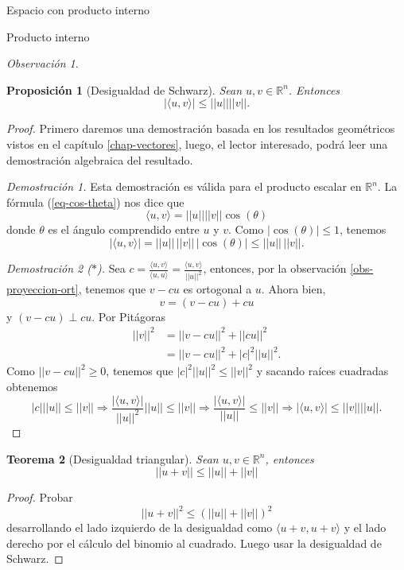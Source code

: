 \documentclass[a4paper,12pt,twoside,spanish]{amsbook}
\newtheorem{teorema}{Teorema}[section]
\newtheorem{proposicion}[teorema]{Proposici\'on}
\theoremstyle{definition}
\theoremstyle{remark}
\newtheorem{observacion}{Observaci\'on}[section]
\newcommand{\la}{\langle}
\newcommand{\ra}{\rangle}
\newcommand{\R}{\mathbb R}
\begin{document}
\begin{chapter}{Espacio con producto interno}
\begin{section}{Producto interno}
\begin{observacion}
		\end{observacion}
		
		\begin{proposicion}[Desigualdad de Schwarz] Sean $u, v\in \R^n$. Entonces 
			$$|\la u, v \ra| \le ||u||||v||.$$
		\end{proposicion}
		\begin{proof} Primero daremos una demostración basada en los resultados geométricos vistos en el capítulo \ref{chap-vectores}, luego,  el lector interesado, podrá leer una demostración algebraica del resultado. 
		
		\textit{Demostración 1.} Esta demostración es válida para el producto escalar en $\R^n$. La fórmula (\ref{eq-cos-theta}) nos dice que 
		\begin{equation*}
			\la u, v \ra = ||u||||v||\cos(\theta)
		\end{equation*}
		donde $\theta$ es el ángulo comprendido entre $u$ y $v$. Como $|\cos(\theta)| \le 1$,  tenemos
		\begin{equation*}
			|\la u, v \ra| = ||u||\,||v||\,|\cos(\theta)| \le  ||u||\,||v||.
		\end{equation*}
		
			
		\textit{Demostración 2 ($*$).}
			Sea $c = \displaystyle\frac{\la u,v\ra}{\la u,u\ra} = \frac{\la u,v\ra}{||u||^2}$, entonces, por la observación \ref{obs-proyeccion-ort}, tenemos que  $ v-cu$ es ortogonal a $u$. Ahora bien, 
			\begin{equation*}
				v = (v - cu) + cu   
			\end{equation*}
			y  $(v - cu) \perp cu$. Por Pitágoras
			\begin{align*}
			||v||^2 &= ||v-cu||^2 +||cu||^2  \\
			&=||v-cu||^2 +|c|^2||u||^2.
			\end{align*}
			Como $||v-cu||^2 \ge 0$, tenemos que $|c|^2||u||^2 \le 	||v||^2$ y sacando raíces cuadradas obtenemos
			$$
			|c|||u|| \le ||v|| \Rightarrow \frac{|\la u,v\ra|}{||u||^2}||u|| \le ||v|| \Rightarrow \frac{|\la u,v\ra|}{||u||}\le ||v|| \Rightarrow |\la u,v\ra|\le ||v||||u||.
			$$
		\end{proof}
		
		\begin{teorema}[Desigualdad triangular] Sean $u, v\in \R^n$, entonces 
			$$||u + v|| \le ||u|| + ||v||	$$
		\end{teorema}
		\begin{proof}
			Probar 
			$$
			||u + v||^2 \le (||u|| + ||v||)^2
			$$
			desarrollando  el lado izquierdo de la desigualdad  como $\la u+v, u+v \ra$ y el lado derecho por el cálculo del binomio al cuadrado. Luego usar la desigualdad de Schwarz.
		\end{proof}
		

\end{section}
\end{chapter}
\end{document}
